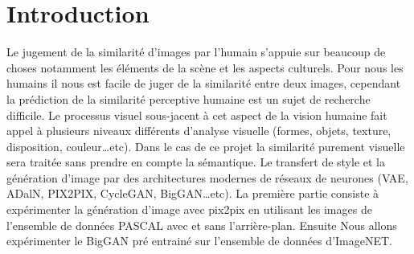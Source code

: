 \chapter{Introduction}

Le jugement de la similarité d’images par l’humain s’appuie sur beaucoup de choses notamment les éléments de la scène et les aspects culturels. Pour nous les humains il nous est facile de juger de la similarité entre deux images, cependant la prédiction de la similarité perceptive humaine est un sujet de recherche difficile. Le processus visuel sous-jacent à cet aspect de la vision humaine fait appel à plusieurs niveaux différents d’analyse visuelle (formes, objets, texture, disposition, couleur…etc). Dans le cas de ce projet la similarité purement visuelle sera traitée sans prendre en compte la sémantique. Le transfert de style et la génération d’image par des architectures modernes de réseaux de neurones (VAE, ADalN, PIX2PIX, CycleGAN, BigGAN…etc). La première partie consiste à expérimenter la génération d’image avec pix2pix en utilisant les images de l’ensemble de données PASCAL avec et sans l’arrière-plan. Ensuite Nous allons expérimenter le BigGAN pré entrainé sur l’ensemble de données d’ImageNET.